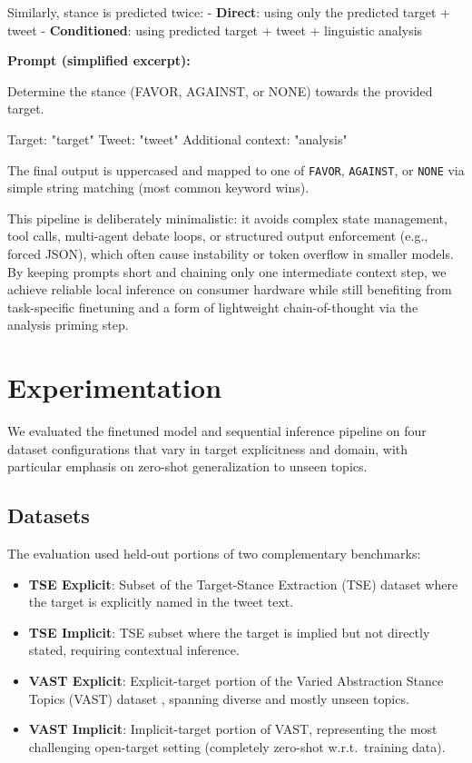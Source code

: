 \documentclass[conference]{IEEEtran}
\begin{document}
Similarly, stance is predicted twice:
- \textbf{Direct}: using only the predicted target + tweet
- \textbf{Conditioned}: using predicted target + tweet + linguistic analysis

\textbf{Prompt (simplified excerpt):}
\begin{tcolorbox}[colback=gray!10, colframe=gray!50, title=Stance Classification Prompt, fonttitle=\small, arc=2pt]
Determine the stance (FAVOR, AGAINST, or NONE) towards the provided target.

Target: "{target}"
Tweet: "{tweet}"
Additional context: "{analysis}"   %
\end{tcolorbox}

The final output is uppercased and mapped to one of \texttt{FAVOR}, \texttt{AGAINST}, or \texttt{NONE} via simple string matching (most common keyword wins).

This pipeline is deliberately minimalistic: it avoids complex state management, tool calls, multi-agent debate loops, or structured output enforcement (e.g., forced JSON), which often cause instability or token overflow in smaller models. By keeping prompts short and chaining only one intermediate context step, we achieve reliable local inference on consumer hardware while still benefiting from task-specific finetuning and a form of lightweight chain-of-thought via the analysis priming step.

\section{Experimentation}

We evaluated the finetuned model and sequential inference pipeline on four dataset configurations that vary in target explicitness and domain, with particular emphasis on zero-shot generalization to unseen topics.

\subsection{Datasets}

The evaluation used held-out portions of two complementary benchmarks:

\begin{itemize}
    \item \textbf{TSE Explicit}: Subset of the Target-Stance Extraction (TSE) dataset where the target is explicitly named in the tweet text.
    \item \textbf{TSE Implicit}: TSE subset where the target is implied but not directly stated, requiring contextual inference.
    \item \textbf{VAST Explicit}: Explicit-target portion of the Varied Abstraction Stance Topics (VAST) dataset \cite{vast2020}, spanning diverse and mostly unseen topics.
    \item \textbf{VAST Implicit}: Implicit-target portion of VAST, representing the most challenging open-target setting (completely zero-shot w.r.t.\ training data).
\end{itemize}
\end{document}
